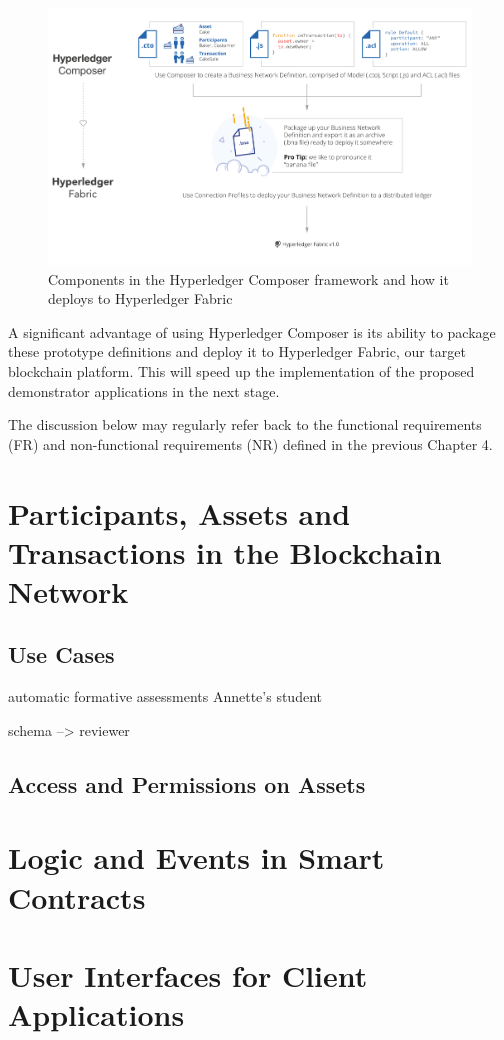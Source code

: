 \begin{figure}[!h] 
    \centering    
    \includegraphics[width=1.0\textwidth]{composer2fabric}
    \caption[Hyperledger Composer]
        {Components in the Hyperledger Composer framework and how it deploys to 
        Hyperledger Fabric \citep{cuicapuza2017composer}}
    \label{fig:composer2fabric}
\end{figure}

A significant advantage of using Hyperledger Composer is its ability to package these 
prototype definitions and deploy it to Hyperledger Fabric, our target blockchain platform. 
This will speed up the implementation of the proposed demonstrator applications 
in the next stage.

The discussion below may regularly refer back to the functional requirements (FR) and 
non-functional requirements (NR) defined in the previous Chapter 4.

\section{Participants, Assets and Transactions in the Blockchain Network}

\subsection{Use Cases}

automatic formative assessments Annette's student

schema --> reviewer

\subsection{Access and Permissions on Assets}

\section{Logic and Events in Smart Contracts}

\section{User Interfaces for Client Applications}